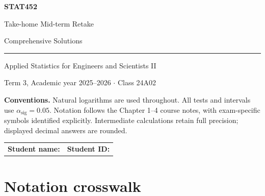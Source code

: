 \documentclass[11pt]{article}
\begin{document}
\hypersetup{pageanchor=false}

\begin{titlepage}
  \centering
  \vspace*{0.85in}
  {\sffamily\color{navy}\Huge\bfseries STAT452\par}
  \vspace{0.20in}
  {\sffamily\color{teal}\LARGE Take-home Mid-term Retake\par}
  \vspace{0.15in}
  {\sffamily\color{navy!85}\LARGE Comprehensive Solutions\par}
  \vspace{0.48in}
  {\color{navy!40}\rule{0.78\textwidth}{1.1pt}\par}
  \vspace{0.48in}
  {\Large Applied Statistics for Engineers and Scientists II\par}
  \vspace{0.16in}
  {\large Term 3, Academic year 2025--2026 \(\cdot\) Class 24A02\par}
  \vfill
  \begin{minipage}{0.78\textwidth}
    \colorbox{softblue}{\parbox{0.94\linewidth}{
      \textbf{Conventions.} Natural logarithms are used throughout.
      All tests and intervals use \(\alpha_{\mathrm{sig}}=0.05\). Notation follows the
      Chapter 1--4 course notes, with exam-specific symbols identified
      explicitly. Intermediate calculations retain full precision; displayed
      decimal answers are rounded.
    }}
  \end{minipage}
  \vfill
  \begin{tabular}{@{}p{}p{}@{}}
    \textbf{Student name:} \hrulefill &
    \textbf{Student ID:} \hrulefill
  \end{tabular}
  \vspace{0.55in}
\end{titlepage}

\hypersetup{pageanchor=true}
\setcounter{tocdepth}{1}
\tableofcontents
\clearpage
{}

\section*{Notation crosswalk}
\end{document}
